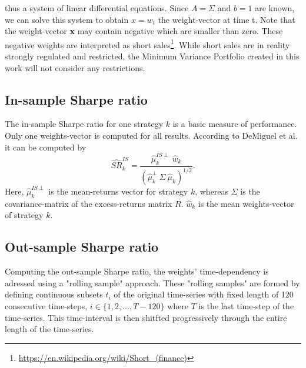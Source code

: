thus a system of linear differential equations. Since $A = \Sigma$ and $b = 1$ are known, we can solve this system to obtain $x = w_t$ the weight-vector at time t. Note that the weight-vector \textbf{x} may contain negative which are smaller than zero. These negative weights are interpreted as short sales\footnote{\url{https://en.wikipedia.org/wiki/Short_(finance)}}. While short sales are in reality strongly regulated and restricted, the Minimum Variance Portfolio created in this work will not consider any restrictions.

\subsection{In-sample Sharpe ratio}
The in-sample Sharpe ratio for one strategy $k$ is a basic measure of performance. Only one weights-vector is computed for all results. According to DeMiguel et al. \cite[p. 1928]{DEM09} it can be computed by
\begin{equation} \label{eq:in-sample-sharpe}
\widehat{SR}^{IS}_{k} = \frac{\hat{\mu}^{IS\perp}_{k}~\hat{w}_k}{\left( \hat{\mu}_k^{\perp}~\Sigma~\hat{\mu}_k\right)^{1/2}}.
\end{equation}
Here, $\hat{\mu}^{IS\perp}_{k}$ is the mean-returns vector for strategy $k$, whereas $\Sigma$ is the covariance-matrix of the excess-returns matrix $R$. $\hat{w}_k$ is the mean weights-vector of strategy $k$.

\subsection{Out-sample Sharpe ratio} \label{subsec:out-sample-sharpe-ratio}
Computing the out-sample Sharpe ratio, the weights' time-dependency is adressed using a "rolling sample" approach\cite[p.1927]{DEM09}. These "rolling samples" are formed by defining continuous subsets $t_i$ of the original time-series with fixed length of 120 consecutive time-steps, $i \in \lbrace1, 2, \dots, T-120 \rbrace$ where $T$ is the last time-step of the time-series. This time-interval is then shitfted progressively through the entire length of the time-series.\\

